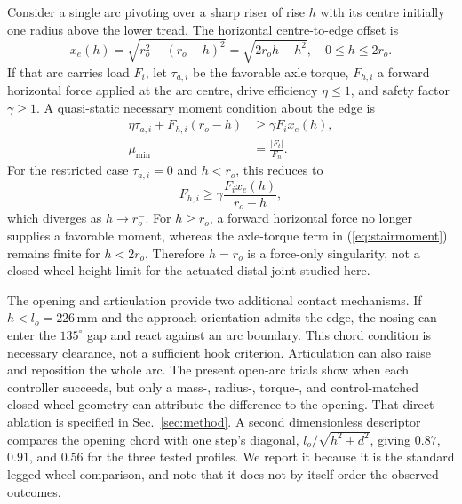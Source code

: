 Consider a single arc pivoting over a sharp riser of rise $h$ with its centre
initially one radius above the lower tread. The horizontal centre-to-edge offset
is
\begin{equation}
 x_e(h)=\sqrt{r_o^2-(r_o-h)^2}=\sqrt{2r_oh-h^2},\quad 0\le h\le 2r_o.
                                                               \label{eq:edgearm}
\end{equation}
If that arc carries load $F_i$, let $\tau_{a,i}$ be the favorable axle torque,
$F_{h,i}$ a forward horizontal force applied at the arc centre, drive efficiency
$\eta\le1$, and safety factor $\gamma\ge1$. A quasi-static necessary moment
condition about the edge is
\begin{align}
 \eta\tau_{a,i}+F_{h,i}(r_o-h)&\ge \gamma F_i x_e(h),          \label{eq:stairmoment}\\
 \mu_{\min}&=\frac{|F_t|}{F_n}.                                \label{eq:stairfriction}
\end{align}
For the restricted case $\tau_{a,i}=0$ and $h<r_o$, this reduces to
\begin{equation}
 F_{h,i}\ge\gamma\frac{F_i x_e(h)}{r_o-h},                    \label{eq:forceonly}
\end{equation}
which diverges as $h\to r_o^-$. For $h\ge r_o$, a forward horizontal force no
longer supplies a favorable moment, whereas the axle-torque term in
(\ref{eq:stairmoment}) remains finite for $h<2r_o$. Therefore $h=r_o$ is a
force-only singularity, not a closed-wheel height limit for the actuated distal
joint studied here.

The opening and articulation provide two additional contact mechanisms. If
$h<l_o=226\,$mm and the approach orientation admits the edge, the nosing can
enter the $135^\circ$ gap and react against an arc boundary. This chord condition
is necessary clearance, not a sufficient hook criterion. Articulation can also
raise and reposition the whole arc. The present open-arc trials show when each
controller succeeds, but only a mass-, radius-, torque-, and control-matched
closed-wheel geometry can attribute the difference to the opening. That direct
ablation is specified in Sec.~\ref{sec:method}.
A second dimensionless descriptor compares the opening chord with one step's
diagonal, $l_o/\sqrt{h^2+d^2}$, giving $0.87$, $0.91$, and $0.56$ for the three
tested profiles. We report it because it is the standard legged-wheel comparison,
and note that it does not by itself order the observed outcomes.
